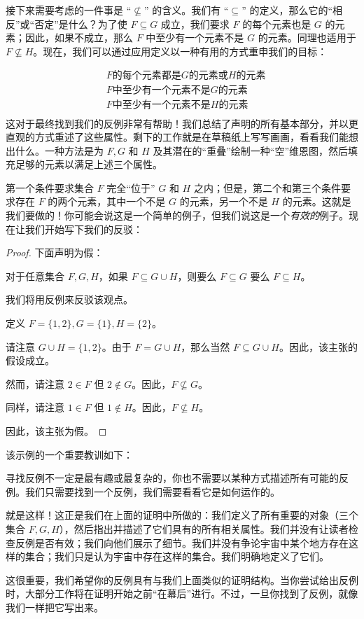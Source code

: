 接下来需要考虑的一件事是 ``$\nsubseteq$'' 的含义。我们有 ``$\subseteq$'' 的定义，那么它的``相反''或``否定''是什么？为了使 $F \subseteq G$ 成立，我们要求 $F$ 的每个元素也是 $G$ 的元素；因此，如果不成立，那么 $F$ 中至少有一个元素不是 $G$ 的元素。同理也适用于 $F \nsubseteq H$。现在，我们可以通过应用定义以一种有用的方式重申我们的目标：

\begin{align*}
    &F \text{的每个元素都是} G \text{的元素或} H \text{的元素} \\
    &F \text{中至少有一个元素不是} G \text{的元素} \\
    &F \text{中至少有一个元素不是} H \text{的元素} \\
\end{align*}
这对于最终找到我们的反例非常有帮助！我们总结了声明的所有基本部分，并以更直观的方式重述了这些属性。剩下的工作就是在草稿纸上写写画画，看看我们能想出什么。一种方法是为 $F, G$ 和 $H$ 及其潜在的``重叠''绘制一种``空''维恩图，然后填充足够的元素以满足上述三个属性。

第一个条件要求集合 $F$ 完全``位于'' $G$ 和 $H$ 之内；但是，第二个和第三个条件要求存在 $F$ 的两个元素，其中一个不是 $G$ 的元素，另一个不是 $H$ 的元素。这就是我们要做的！你可能会说这是一个简单的例子，但我们说这是一个\emph{有效的}例子。现在让我们开始写下我们的反驳：

\begin{proof}
    下面声明为假：
    \begin{center}
        对于任意集合 $F, G, H$，如果 $F \subseteq G \cup H$，则要么 $F \subseteq G$ 要么 $F \subseteq H$。
    \end{center}
    我们将用反例来反驳该观点。

    定义 $F = \{1, 2\}, G = \{1\}, H = \{2\}$。

    请注意 $G \cup H = \{1, 2\}$。由于 $F = G \cup H$，那么当然 $F \subseteq G \cup H$。因此，该主张的假设成立。

    然而，请注意 $2 \in F$ 但 $2 \notin G$。因此，$F \nsubseteq G$。

    同样，请注意 $1 \in F$ 但 $1 \notin H$。因此，$F \nsubseteq H$。

    因此，该主张为假。
\end{proof}

该示例的一个重要教训如下：

\begin{center}
    寻找反例不一定是最有趣或最复杂的，你也不需要以某种方式描述所有可能的反例。我们只需要找到一个反例，我们需要看看它是如何运作的。
\end{center}

就是这样！这正是我们在上面的证明中所做的：我们定义了所有重要的对象（三个集合 $F,G,H$），然后指出并描述了它们具有的所有相关属性。我们并没有让读者检查反例是否有效；我们向他们展示了细节。我们并没有争论宇宙中某个地方存在这样的集合；我们只是认为宇宙中存在这样的集合。我们明确地定义了它们。

这很重要，我们希望你的反例具有与我们上面类似的证明结构。当你尝试给出反例时，大部分工作将在证明开始之前``在幕后''进行。不过，一旦你找到了反例，就像我们一样把它写出来。
